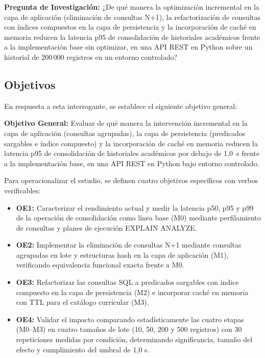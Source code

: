 \documentclass[conference]{IEEEtran}
\begin{document}
\textbf{Pregunta de Investigación:} ¿De qué manera la optimización incremental en la capa de aplicación (eliminación de consultas N+1), la refactorización de consultas con índices compuestos en la capa de persistencia y la incorporación de caché en memoria reducen la latencia p95 de consolidación de historiales académicos frente a la implementación base sin optimizar, en una API REST en Python sobre un historial de 200\,000 registros en un entorno controlado?

\subsection{Objetivos}
En respuesta a esta interrogante, se establece el siguiente objetivo general:

\textbf{Objetivo General:} Evaluar de qué manera la intervención incremental en la capa de aplicación (consultas agrupadas), la capa de persistencia (predicados sargables e índice compuesto) y la incorporación de caché en memoria reducen la latencia p95 de consolidación de historiales académicos por debajo de 1,0~s frente a la implementación base, en una API REST en Python bajo entorno controlado.

Para operacionalizar el estudio, se definen cuatro objetivos específicos con verbos verificables:
\begin{itemize}
    \setlength{\itemsep}{1pt}
    \setlength{\parskip}{0pt}
    \item \textbf{OE1:} Caracterizar el rendimiento actual y medir la latencia p50, p95 y p99 de la operación de consolidación como línea base (M0) mediante perfilamiento de consultas y planes de ejecución EXPLAIN ANALYZE.
    \item \textbf{OE2:} Implementar la eliminación de consultas N+1 mediante consultas agrupadas en lote y estructuras hash en la capa de aplicación (M1), verificando equivalencia funcional exacta frente a M0.
    \item \textbf{OE3:} Refactorizar las consultas SQL a predicados sargables con índice compuesto en la capa de persistencia (M2) e incorporar caché en memoria con TTL para el catálogo curricular (M3).
    \item \textbf{OE4:} Validar el impacto comparando estadísticamente las cuatro etapas (M0--M3) en cuatro tamaños de lote (10, 50, 200 y 500 registros) con 30 repeticiones medidas por condición, determinando significancia, tamaño del efecto y cumplimiento del umbral de 1,0 s.
\end{itemize}
\end{document}

